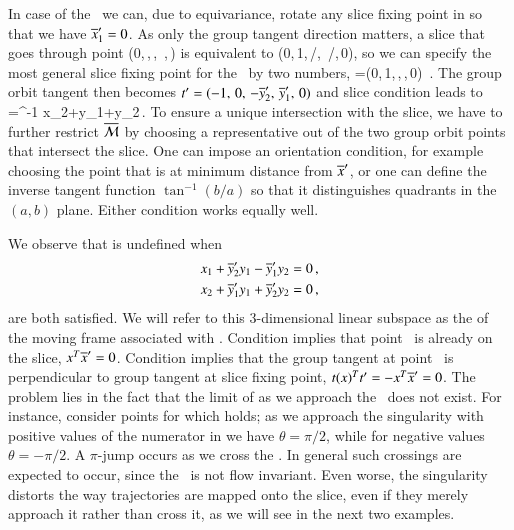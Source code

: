 \documentclass[final,number,sort&compress]{elsarticle}
\begin{document}
In case of the \cLe\ we can, due to equivariance, rotate any
slice fixing point in  so that we have
${\overline{x}'_{1}}=0$.
As only the group tangent direction matters, a slice that
goes through point
    (0,\,,\,,\,
       ,\,)
is equivalent to
    (0,\,1,\,/,\,
       /,\,0),
so we can specify the most general slice fixing point for
the \cLe\ by two numbers,
\beq
\slicep=(0,\,1,\,,\,,\,0)
\,.
The group orbit tangent then becomes
$\sliceTan{}=(-1,\,0,\,-\slicepComp{y}{2},\,\slicepComp{y}{1},\,0)$
and slice condition  leads to
\beq
  \theta=\tan^{-1}
			  {x_2+y_1+y_2}\,.
To ensure a unique intersection with the slice, we have to
further restrict $\pSRed$ by choosing a representative out of
the two group orbit points that intersect the slice. One can
impose an orientation condition, for example choosing the
point that is at minimum distance from $\slicep$, or one can
define the inverse tangent function $\tan^{-1}({b}/{a})$ so
that it distinguishes quadrants in the $(a,b)$ plane. Either
condition works equally well.

We observe that  is undefined when
\begin{subequations}\label{cLeMFsing}
  \begin{align}
    x_1+\slicepComp{y}{2}y_1-\slicepComp{y}{1}y_2 &=0 \label{cLeMFsingOnSlice}\cont
    x_2+\slicepComp{y}{1}y_1+\slicepComp{y}{2}y_2 &=0 \label{cLeMFsingPerpTan}\,,
  \end{align}
\end{subequations}
are both satisfied. We will refer to this $3$-dimensional
linear subspace as the \emph{\sset} of the moving frame
associated with . Condition
 implies that point \ssp\ is already
on the slice, $x^T{\overline{x}'}=0$. Condition
 implies that the group tangent at
point \ssp\ is perpendicular to group tangent at slice fixing
point, $t{}(x)^Tt'_{}=-x^T{\overline{x}'}=0$. The
problem lies in the fact that the limit of 
as we approach the \sset\ does not exist. For instance,
consider points for which  holds; as
we approach the singularity with positive values of the
numerator in  we have $\theta=\pi/2$, while for
negative values $\theta=-\pi/2$. A $\pi$-jump occurs as we
cross the \sset. In general such crossings are expected to
occur, since the \sset\ is not flow in\-vari\-ant. Even
worse, the singularity distorts the way trajectories are
mapped onto the slice, even if they merely approach it rather
than cross it, as we will see in the next two examples.
\end{document}
